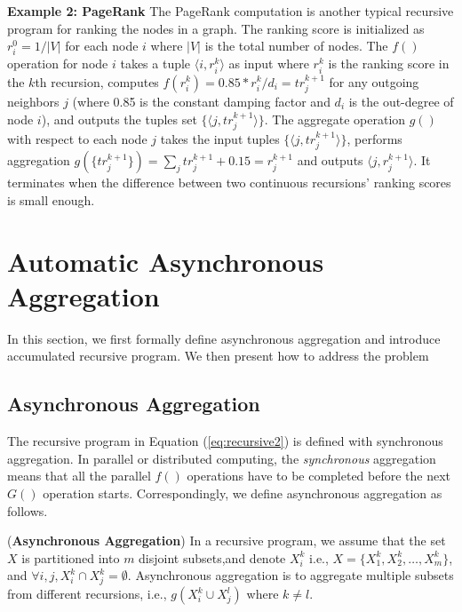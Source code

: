 \documentclass{vldb}
\begin{document}
\textbf{Example 2: PageRank} The PageRank computation is another typical recursive program for ranking the nodes in a graph. The ranking score is initialized as $r_i^0=1/|V|$ for each node $i$ where $|V|$ is the total number of nodes. The $f()$ operation for node $i$ takes a tuple $\langle i,r_i^k\rangle$ as input where $r_i^k$ is the ranking score in the $k$th recursion, computes $f(r_i^k)=0.85*r_i^k/d_i=tr_j^{k+1}$ for any outgoing neighbors $j$ (where 0.85 is the constant damping factor and $d_i$ is the out-degree of node $i$), and outputs the tuples set $\{\langle j,tr_j^{k+1}\rangle\}$. The aggregate operation $g()$ with respect to each node $j$ takes the input tuples $\{\langle j,tr_j^{k+1}\rangle\}$, performs aggregation $g(\{tr_j^{k+1}\})=\sum_j{tr_j^{k+1}}+0.15=r_j^{k+1}$ and outputs $\langle j,r_j^{k+1}\rangle$. It terminates when the difference between two continuous recursions' ranking scores is small enough.

\section{Automatic Asynchronous Aggregation}
\label{sec:async}
In this section, we first formally define asynchronous aggregation and introduce accumulated recursive program. We then present how to address the problem 

\subsection{Asynchronous Aggregation}
\label{sec:async:async}

The recursive program in Equation (\ref{eq:recursive2}) is defined with synchronous aggregation. In parallel or distributed computing, the \emph{synchronous} aggregation means that all the parallel $f()$ operations have to be completed before the next $G()$ operation starts. %
Correspondingly, we define asynchronous aggregation as follows.

\begin{definition}
	\label{def:asyncaggre}
	(\textbf{Asynchronous Aggregation}) In a recursive program, we assume that the set $X$  is partitioned into $m$ disjoint subsets,and denote $X_i^k$ i.e., $X=\{X_1^k,X_2^k,\ldots,X_m^k\}$, and $\forall i,j, X_i^k\cap X_j^k=\emptyset$. Asynchronous aggregation is to aggregate multiple subsets from different recursions, i.e., $g(X_i^k\cup X_j^{l})$ where $k\neq l$.
\end{definition}
\end{document}
